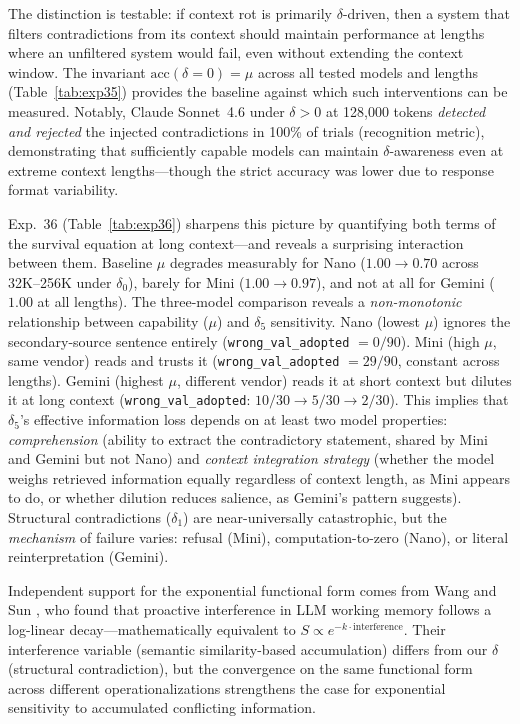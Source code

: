 \documentclass[11pt,a4paper]{article}
\begin{document}
\noindent The distinction is testable: if context rot is primarily $\delta$-driven, then a system that filters contradictions from its context should maintain performance at lengths where an unfiltered system would fail, even without extending the context window. The invariant $\text{acc}(\delta = 0) = \mu$ across all tested models and lengths (Table~\ref{tab:exp35}) provides the baseline against which such interventions can be measured. Notably, Claude Sonnet~4.6 under $\delta > 0$ at 128{,}000 tokens \emph{detected and rejected} the injected contradictions in 100\% of trials (recognition metric), demonstrating that sufficiently capable models can maintain $\delta$-awareness even at extreme context lengths---though the strict accuracy was lower due to response format variability.

Exp.~36 (Table~\ref{tab:exp36}) sharpens this picture by quantifying both terms of the survival equation at long context---and reveals a surprising interaction between them. Baseline $\mu$ degrades measurably for Nano ($1.00 \to 0.70$ across 32K--256K under $\delta_0$), barely for Mini ($1.00 \to 0.97$), and not at all for Gemini ($1.00$ at all lengths). The three-model comparison reveals a \emph{non-monotonic} relationship between capability ($\mu$) and $\delta_5$ sensitivity. Nano (lowest $\mu$) ignores the secondary-source sentence entirely (\texttt{wrong\_val\_adopted} $= 0/90$). Mini (high $\mu$, same vendor) reads and trusts it (\texttt{wrong\_val\_adopted} $= 29/90$, constant across lengths). Gemini (highest $\mu$, different vendor) reads it at short context but dilutes it at long context (\texttt{wrong\_val\_adopted}: $10/30 \to 5/30 \to 2/30$). This implies that $\delta_5$'s effective information loss depends on at least two model properties: \emph{comprehension} (ability to extract the contradictory statement, shared by Mini and Gemini but not Nano) and \emph{context integration strategy} (whether the model weighs retrieved information equally regardless of context length, as Mini appears to do, or whether dilution reduces salience, as Gemini's pattern suggests). Structural contradictions ($\delta_1$) are near-universally catastrophic, but the \emph{mechanism} of failure varies: refusal (Mini), computation-to-zero (Nano), or literal reinterpretation (Gemini).

Independent support for the exponential functional form comes from Wang and Sun \citep{wang2025interference}, who found that proactive interference in LLM working memory follows a log-linear decay---mathematically equivalent to $S \propto e^{-k \cdot \text{interference}}$. Their interference variable (semantic similarity-based accumulation) differs from our $\delta$ (structural contradiction), but the convergence on the same functional form across different operationalizations strengthens the case for exponential sensitivity to accumulated conflicting information.
\end{document}
